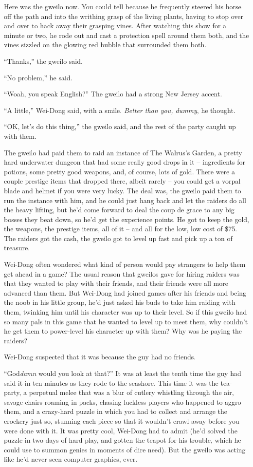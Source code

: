 Here was the gweilo now. You could tell because he frequently
steered his horse off the path and into the writhing grasp of the
living plants, having to stop over and over to hack away their
grasping vines. After watching this show for a minute or two, he
rode out and cast a protection spell around them both, and the
vines sizzled on the glowing red bubble that surrounded them both.

``Thanks,'' the gweilo said.

``No problem,'' he said.

``Woah, you speak English?'' The gweilo had a strong New Jersey
accent.

``A little,'' Wei-Dong said, with a smile.
\emph{Better than you, dummy}, he thought.

``OK, let's do this thing,'' the gweilo said, and the rest of the
party caught up with them.

The gweilo had paid them to raid an instance of The Walrus's
Garden, a pretty hard underwater dungeon that had some really good
drops in it -- ingredients for potions, some pretty good weapons,
and, of course, lots of gold. There were a couple prestige items
that dropped there, albeit rarely -- you could get a vorpal blade
and helmet if you were very lucky. The deal was, the gweilo paid
them to run the instance with him, and he could just hang back and
let the raiders do all the heavy lifting, but he'd come forward to
deal the coup de grace to any big bosses they beat down, so he'd
get the experience points. He got to keep the gold, the weapons,
the prestige items, all of it -- and all for the low, low cost of
\$75. The raiders got the cash, the gweilo got to level up fast and
pick up a ton of treasure.

Wei-Dong often wondered what kind of person would pay strangers to
help them get ahead in a game? The usual reason that gweilos gave
for hiring raiders was that they wanted to play with their friends,
and their friends were all more advanced than them. But Wei-Dong
had joined games after his friends and being the noob in his little
group, he'd just asked his buds to take him raiding with them,
twinking him until his character was up to their level. So if this
gweilo had so many pals in this game that he wanted to level up to
meet them, why couldn't he get them to power-level his character up
with them? Why was he paying the raiders?

Wei-Dong suspected that it was because the guy had no friends.

``God\emph{damn} would you look at that?'' It was at least the tenth
time the guy had said it in ten minutes as they rode to the
seashore. This time it was the tea-party, a perpetual melee that
was a blur of cutlery whistling through the air, savage chairs
roaming in packs, chasing luckless players who happened to aggro
them, and a crazy-hard puzzle in which you had to collect and
arrange the crockery just so, stunning each piece so that it
wouldn't crawl away before you were done with it. It was pretty
cool, Wei-Dong had to admit (he'd solved the puzzle in two days of
hard play, and gotten the teapot for his trouble, which he could
use to summon genies in moments of dire need). But the gweilo was
acting like he'd never seen computer graphics, ever.

